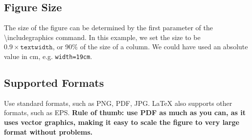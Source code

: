 \subsection{Figure Size}
The size of the figure can be determined by the first parameter of the \textbackslash{}includegraphics command.
In this example, we set the size to be $0.9 \times \texttt{textwidth}$, or 90\% of the size of a column.
We could have used an absolute value in cm, e.g. \texttt{width=19cm}.

\subsection{Supported Formats}
Use standard formats, such as PNG, PDF, JPG.
LaTeX also supports other formats, such as EPS.
\textbf{Rule of thumb: use PDF as much as you can, as it uses vector graphics, making it easy to scale the figure to very large format without problems.}

